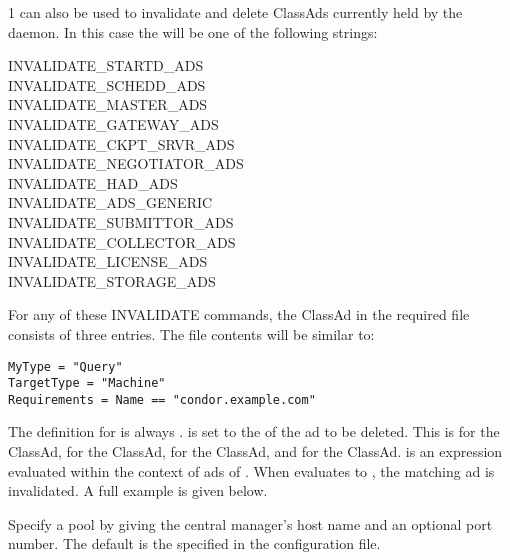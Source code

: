 \begin{ManPage}{\label{man-condor-advertise}}{1}
 can also be used to invalidate and delete
ClassAds currently held by the  daemon.  In this case
the  will be one of the following strings:
\begin{description}
\item[INVALIDATE\_STARTD\_ADS]
\item[INVALIDATE\_SCHEDD\_ADS]
\item[INVALIDATE\_MASTER\_ADS]
\item[INVALIDATE\_GATEWAY\_ADS]
\item[INVALIDATE\_CKPT\_SRVR\_ADS]
\item[INVALIDATE\_NEGOTIATOR\_ADS]
\item[INVALIDATE\_HAD\_ADS]
\item[INVALIDATE\_ADS\_GENERIC]
\item[INVALIDATE\_SUBMITTOR\_ADS]
\item[INVALIDATE\_COLLECTOR\_ADS]
\item[INVALIDATE\_LICENSE\_ADS]
\item[INVALIDATE\_STORAGE\_ADS]
\end{description}

For any of these INVALIDATE commands, the ClassAd in the required file
consists of three entries.
The file contents will be similar to:
\begin{verbatim}
MyType = "Query"
TargetType = "Machine"
Requirements = Name == "condor.example.com"
\end{verbatim}
The definition for  is always .
 is set to the  of the ad to be deleted.
This  is
 for the  ClassAd,
 for the  ClassAd,
 for the  ClassAd, and
 for the  ClassAd.
 is an expression evaluated within the context
of ads of .
When  evaluates to ,
the matching ad is invalidated.  
A full example is given below.


\begin{Options}
    \ToolArgsBaseDesc
            {Specify a pool by
            giving the central manager's host name and an optional port
	    number.  The default is the
	     specified in the configuration file.}
\end{Options}


\end{ManPage}
